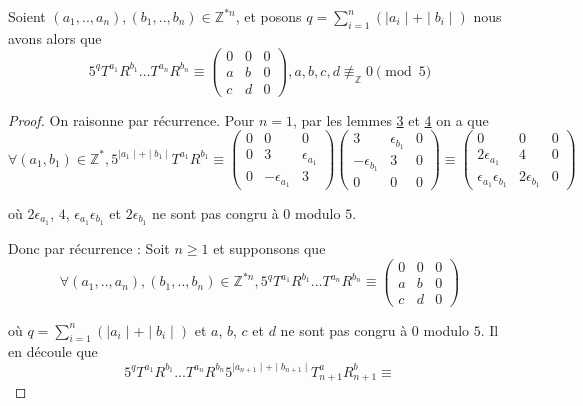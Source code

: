 \begin{lemma}\label{lemme7}
  Soient $(a_1,..,a_n), (b_1,..,b_n) \in \mathbb{Z}^{*n}$, et posons $q=\sum_{i=1}^n(\mid a_i\mid + \mid b_i \mid)$ nous avons alors que
  $$5^qT^{a_1}R^{b_1}...T^{a_n}R^{b_n} \equiv  \begin{pmatrix} 0 & 0 & 0 \\ a & b & 0 \\
 c  & d & 0 \end{pmatrix}, a,b,c,d \not \equiv_\mathbb{Z} 0 \pmod 5$$
\end{lemma}
\begin{proof}
  \hfill

  On raisonne par récurrence. Pour $n = 1$, par les lemmes \hyperref[lemme4]{3} et \hyperref[lemme5]{ 4} on a que
  $$\forall (a_1,b_1)\in \mathbb{Z}^*, 5^{\mid a_1 \mid + \mid b_1 \mid}T^{a_1}R^{b_1}
  \equiv
  \begin{pmatrix}
     0 & 0 & 0 \\
    0 & 3 & \epsilon_{a_1} \\
   0 & -\epsilon_{a_1} & 3
  \end{pmatrix}
  \begin{pmatrix}
     3 & \epsilon_{b_1} & 0 \\
   -\epsilon_{b_1} & 3 & 0 \\
   0 & 0 & 0
  \end{pmatrix}
  \equiv
  \begin{pmatrix}
     0 & 0 & 0 \\
   2\epsilon_{a_1} & 4 & 0 \\
  \epsilon_{a_1}\epsilon_{b_1}  & 2\epsilon_{b_1} & 0
  \end{pmatrix}
   $$\par
  où $2\epsilon_{a_1}$, $4$, $\epsilon_{a_1}\epsilon_{b_1} $ et $2\epsilon_{b_1}$ ne sont pas congru à $0$ modulo $5$.\par
  Donc par récurrence : Soit $n \ge 1$ et supponsons que  $$\forall (a_1,..,a_n), (b_1,..,b_n) \in \mathbb{Z}^{*n}, 5^qT^{a_1}R^{b_1}...T^{a_n}R^{b_n} \equiv  \begin{pmatrix} 0 & 0 & 0 \\ a & b & 0 \\
  c  & d & 0 \end{pmatrix}$$\par
  où $q=\sum_{i=1}^n(\mid a_i\mid + \mid b_i \mid)$ et $a$, $b$, $c$ et $d$ ne sont pas congru à $0$ modulo $5$. Il en découle que
  $$5^qT^{a_1}R^{b_1}...T^{a_n}R^{b_n}5^{\mid a_{n+1} \mid + \mid b_{n+1} \mid}T^ a_{n+1} R^ b_{n+1}\equiv
$$
\end{proof}
